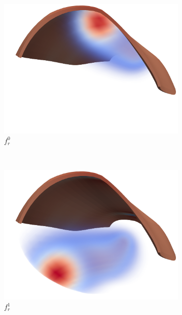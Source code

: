 \begin{figure}[H]
  \centering%
  \begin{subfigure}[t]{0.23\textwidth}%
    \centering%
    \includegraphics[width=\textwidth]{images/results/application/multidomain_fr0_cropped.png}%
    \caption{$f_r^0$}%
    \label{fig:fr0}%
  \end{subfigure}
  \,
  \begin{subfigure}[t]{0.23\textwidth}%
    \centering%
    \includegraphics[width=\textwidth]{images/results/application/multidomain_fr1_cropped.png}%
    \caption{$f_r^1$}%
    \label{fig:fr1}%
  \end{subfigure}
  \,
  \begin{subfigure}[t]{0.23\textwidth}%

\end{subfigure}
\end{figure}
